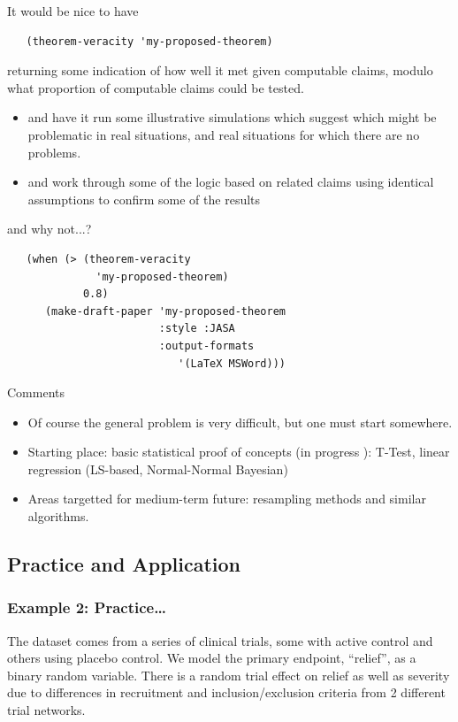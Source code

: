 \documentclass{beamer}
\begin{document}
\begin{frame}[fragile]{It would be nice to have}
\begin{verbatim}
   (theorem-veracity 'my-proposed-theorem)
\end{verbatim}
returning some indication of how well it met given computable claims,
modulo what proportion of computable claims could be tested.
\begin{itemize}
\item and have it run some illustrative simulations which suggest
  which might be problematic in real situations, and real situations
  for which there are no problems.
\item and work through some of the logic based on related claims using
  identical assumptions to confirm some of the results
\end{itemize}
\end{frame}

\begin{frame}[fragile]{and why not...?}
\begin{verbatim}
   (when (> (theorem-veracity
              'my-proposed-theorem)
            0.8)
      (make-draft-paper 'my-proposed-theorem
                        :style :JASA
                        :output-formats
                           '(LaTeX MSWord)))
\end{verbatim}
\end{frame}

\begin{frame}{Comments}
  \begin{itemize}
  \item Of course the general problem is very difficult, but one must
    start somewhere.
  \item Starting place: basic statistical proof of concepts (in
    progress ): T-Test, linear regression (LS-based, Normal-Normal
    Bayesian)
  \item Areas targetted for medium-term future: resampling methods and
    similar algorithms.
  \end{itemize}
\end{frame}

\subsection{Practice and Application}

\begin{frame}
  \frametitle{Example 2: Practice\ldots} 
  \label{example2}
  The dataset comes from a series of clinical trials, some with active
  control and others using placebo control.  We model the primary
  endpoint, ``relief'', as a binary random variable.  There is a
  random trial effect on relief as well as severity due to differences
  in recruitment and inclusion/exclusion criteria from 2 different
  trial networks.
\end{frame}
\end{document}
